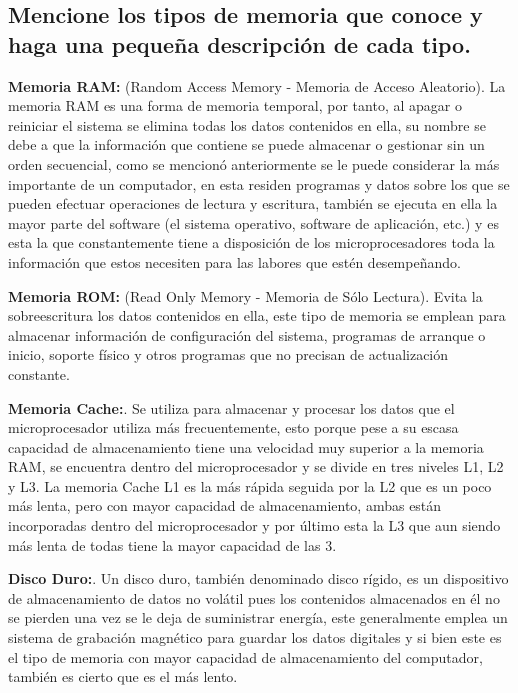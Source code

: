 \documentclass{article}
\begin{document}
\subsection{Mencione los tipos de memoria que conoce y haga una pequeña descripción de cada tipo.}

\textbf{Memoria RAM:} (Random Access Memory - Memoria de Acceso Aleatorio). 
La memoria RAM es una forma de memoria temporal, por tanto, al apagar o reiniciar el sistema se elimina todas los datos contenidos en ella, su nombre se debe a que la información que contiene se puede almacenar o gestionar sin un orden secuencial, como se mencionó anteriormente se le puede considerar la más importante de un computador, en esta residen programas y datos sobre los que se pueden efectuar operaciones de lectura y escritura, también se ejecuta en ella la mayor parte del software (el sistema operativo, software de aplicación, etc.) y es esta la que constantemente tiene a disposición de los microprocesadores toda la información que estos necesiten para las labores que estén desempeñando.\cite{Consepto.de}


\vspace{0.5cm}


\textbf{Memoria ROM:} (Read Only Memory - Memoria de Sólo Lectura).
Evita la sobreescritura los datos contenidos en ella, este tipo de memoria se emplean para almacenar información de configuración del sistema, programas de arranque o inicio, soporte físico y otros programas que no precisan de actualización constante.\cite{M_ROM}

\vspace{0.5cm}

\textbf{Memoria Cache:}.
Se utiliza para almacenar y procesar los datos que el microprocesador utiliza más frecuentemente, esto porque pese a su escasa capacidad de almacenamiento tiene una velocidad muy superior a la memoria RAM, se encuentra dentro del microprocesador y se divide en tres niveles L1, L2 y L3. La memoria Cache L1 es la más rápida seguida por la L2 que es un poco más lenta, pero con mayor capacidad de almacenamiento, ambas están incorporadas dentro del microprocesador y por último esta la L3 que aun siendo más lenta de todas tiene la mayor capacidad de las 3.

\vspace{0.5cm}

\textbf{Disco Duro:}. Un disco duro, también denominado disco rígido, es un dispositivo de almacenamiento de datos no volátil pues los contenidos almacenados en él no se pierden una vez se le deja de suministrar energía, este generalmente emplea un sistema de grabación magnético para guardar los datos digitales y si bien este es el tipo de memoria con mayor capacidad de almacenamiento del computador, también es cierto que es el más lento.
\end{document}
